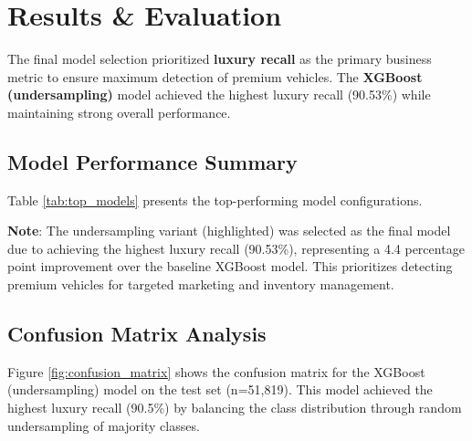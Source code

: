 \documentclass[12pt, a4paper]{article}
\begin{document}
\newpage
\section{Results \& Evaluation}
The final model selection prioritized \textbf{luxury recall} as the primary business metric to ensure maximum detection of premium vehicles. The \textbf{XGBoost (undersampling)} model achieved the highest luxury recall (90.53\%) while maintaining strong overall performance.

\subsection{Model Performance Summary}
Table \ref{tab:top_models} presents the top-performing model configurations.

\begin{table}[ht]
\centering
\caption{Top Model Configurations}
\label{tab:top_models}
\renewcommand{\arraystretch}{1.3}
\end{table}

\textbf{Note}: The undersampling variant (highlighted) was selected as the final model due to achieving the highest luxury recall (90.53\%), representing a 4.4 percentage point improvement over the baseline XGBoost model. This prioritizes detecting premium vehicles for targeted marketing and inventory management.

\subsection{Confusion Matrix Analysis}
Figure \ref{fig:confusion_matrix} shows the confusion matrix for the XGBoost (undersampling) model on the test set (n=51,819). This model achieved the highest luxury recall (90.5\%) by balancing the class distribution through random undersampling of majority classes.
\end{document}
